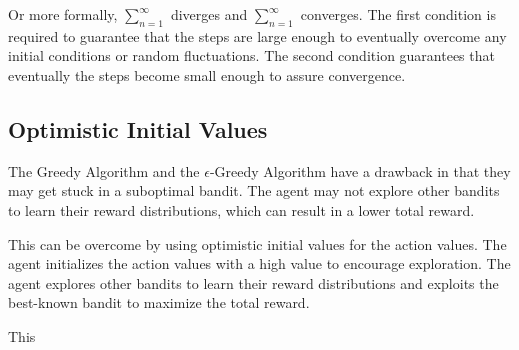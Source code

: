Or more formally, $\sum_{n=1}^{\infty}$ diverges and $\sum_{n=1}^{\infty}$ converges. The first condition is required to guarantee that the steps are large enough to eventually overcome any initial conditions or random fluctuations. The second condition guarantees that eventually the steps become small enough to assure convergence.

\subsection{Optimistic Initial Values}

The Greedy Algorithm and the $\epsilon$-Greedy Algorithm have a drawback in that they may get stuck in a suboptimal bandit. The agent may not explore other bandits to learn their reward distributions, which can result in a lower total reward.

This can be overcome by using optimistic initial values for the action values. The agent initializes the action values with a high value to encourage exploration. The agent explores other bandits to learn their reward distributions and exploits the best-known bandit to maximize the total reward.

This 
